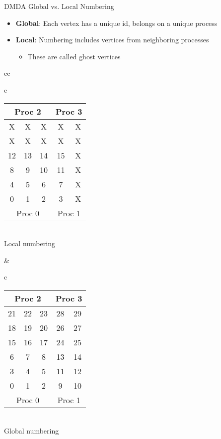 \begin{frame}{DMDA Global vs. Local Numbering}

\begin{itemize}
  \item {\bf Global}: Each vertex has a unique id, belongs on a unique process

  \item {\bf Local}: Numbering includes vertices from neighboring processes
  \begin{itemize}
    \item These are called {\color{cyan}ghost} vertices
  \end{itemize}
\end{itemize}

\begin{center}
\begin{tabular}{cc}
\begin{tabular}{c}
\begin{tabular}{|ccc|cc|}
\hline
\multicolumn{3}{|c|}{Proc 2} & \multicolumn{2}{c|}{Proc 3} \\
\hline
 X &  X &  X &  X &  X \\
 X &  X &  X &  X &  X \\
{\color{cyan}12} & {\color{cyan}13} & {\color{cyan}14} & {\color{cyan}15} &  X \\
\hline
 8 &  9 & 10 & {\color{cyan}11} &  X \\
 4 &  5 &  6 & {\color{cyan}7} &  X \\
 0 &  1 &  2 & {\color{cyan}3} &  X \\
\hline
\multicolumn{3}{|c|}{Proc 0} & \multicolumn{2}{c|}{Proc 1} \\
\hline
\end{tabular} \\
Local numbering
\end{tabular}
& 
\begin{tabular}{c}
\begin{tabular}{|ccc|cc|}
\hline
\multicolumn{3}{|c|}{Proc 2} & \multicolumn{2}{c|}{Proc 3} \\
\hline
21 & 22 & 23 & 28 & 29 \\
18 & 19 & 20 & 26 & 27 \\
15 & 16 & 17 & 24 & 25 \\
\hline
 6 &  7 &  8 & 13 & 14 \\
 3 &  4 &  5 & 11 & 12 \\
 0 &  1 &  2 &  9 & 10 \\
\hline
\multicolumn{3}{|c|}{Proc 0} & \multicolumn{2}{c|}{Proc 1} \\
\hline
\end{tabular}\\
Global numbering
\end{tabular}
\end{tabular}
\end{center}
\end{frame}

